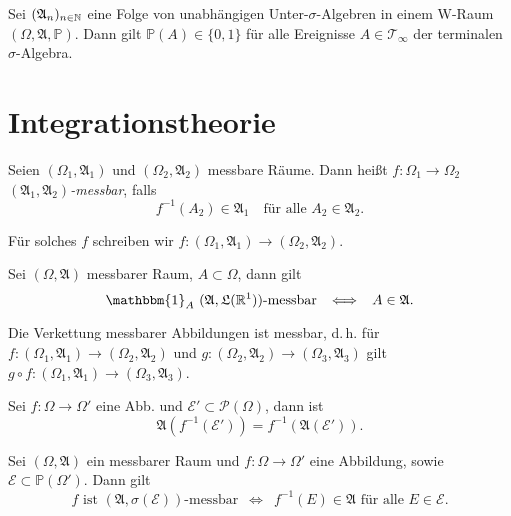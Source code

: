 \documentclass{cheat-sheet}
\newcommand{\Alg}{\mathfrak{A}} %
\newcommand{\LebAlg}{\mathfrak{L}} %
\renewcommand{\P}{\mathbb{P}} %
\newcommand{\ind}{\mathbbm{1}} %
\begin{document}

\begin{satz}
  Sei $(\Alg_n)_{n \in \N}$ eine Folge von unabhängigen Unter-$\sigma$-Algebren in einem W-Raum $(\Omega, \Alg, \P)$. Dann gilt $\P(A) \in \{ 0, 1 \}$ für alle Ereignisse $A \in \mathcal{T}_\infty$ der terminalen $\sigma$-Algebra.
\end{satz}


\section{Integrationstheorie}


\begin{defn}
  Seien $(\Omega_1, \Alg_1)$ und $(\Omega_2, \Alg_2)$ messbare Räume. Dann heißt $f : \Omega_1 \to \Omega_2$ \emph{$(\Alg_1, \Alg_2)$-messbar}, falls
  \[ f^{-1}(A_2) \in \Alg_1 \quad \text{für alle } A_2 \in \Alg_2. \]
\end{defn}

\begin{nota}
  Für solches $f$ schreiben wir $f : (\Omega_1, \Alg_1) \to (\Omega_2, \Alg_2)$.
\end{nota}

\begin{beobachtung}
  Sei $(\Omega, \Alg)$ messbarer Raum, $A \subset \Omega$, dann gilt
  \[ \ind_A \text{ $(\Alg, \LebAlg(\R^1))$-messbar} \enspace \iff \enspace A \in \Alg. \]
\end{beobachtung}



\begin{lem}
  Die Verkettung messbarer Abbildungen ist messbar, d.\,h. für $f : (\Omega_1, \Alg_1) \to (\Omega_2, \Alg_2)$ und $g : (\Omega_2, \Alg_2) \to (\Omega_3, \Alg_3)$ gilt $g \circ f : (\Omega_1, \Alg_1) \to (\Omega_3, \Alg_3)$.
\end{lem}

\begin{lem}
  Sei $f : \Omega \to \Omega'$ eine Abb. und $\mathcal{E}' \subset \mathcal{P}(\Omega)$, dann ist
  \[ \Alg(f^{-1}(\mathcal{E}')) = f^{-1}(\Alg(\mathcal{E}')). \]
\end{lem}

\begin{lem}
  Sei $(\Omega, \Alg)$ ein messbarer Raum und $f : \Omega \to \Omega'$ eine Abbildung, sowie $\mathcal{E} \subset \P(\Omega')$. Dann gilt
  \[ f \text{ ist $(\Alg, \sigma(\mathcal{E}))$-messbar} \enspace \iff \enspace f^{-1}(E) \in \Alg \text{ für alle } E \in \mathcal{E}. \]
\end{lem}
\end{document}
